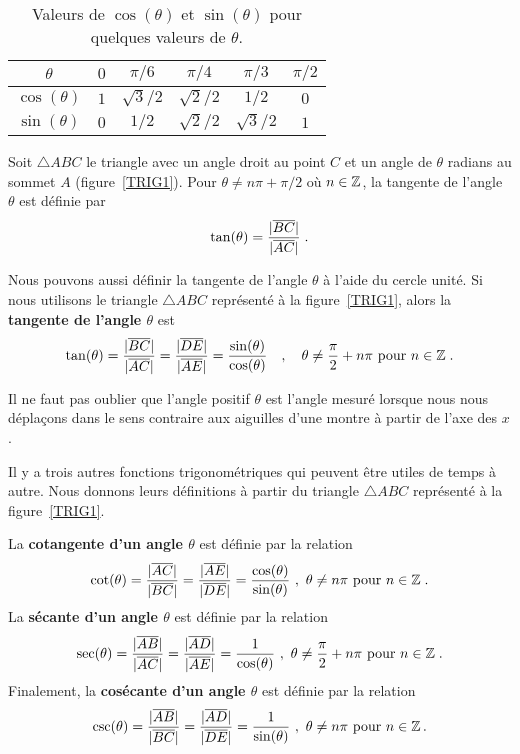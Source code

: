 {\begin{table}
\begin{center}
\begin{tabular}{c|c|c|c|c|c}
$\theta$ & $0$ & $\pi/6$ & $\pi/4$ & $\pi/3$ & $\pi/2$ \\
\hline
$\cos(\theta)$ & $1$ & $\sqrt{3}/2$ &
$\sqrt{2}/2$ & $1/2$ & $0$ \\
\hline
$\sin(\theta)$ & $0$ & $1/2$ &
$\sqrt{2}/2$ & $\sqrt{3}/2$ & $1$
\end{tabular}
\end{center}
\caption{Valeurs de $\cos(\theta)$ et $\sin(\theta)$ pour quelques
valeurs de $\theta$. \label{BAS_VAL}}
\end{table} 

Soit $\triangle ABC$ le triangle avec un angle droit au point $C$ et
un angle de $\theta$ radians au sommet $A$ (figure~\ref{TRIG1}).
Pour $\theta \neq n\pi + \pi/2$ où $n \in \mathbb{Z}$, la tangente de l'angle
$\theta$ est définie par
\[
\tan(\theta) = \frac{|\overline{BC}|}{|\overline{AC}|} \; .
\]

Nous pouvons aussi définir la tangente de l'angle $\theta$ à l'aide du
cercle unité.  Si nous utilisons le triangle $\triangle ABC$
représenté à la figure~\ref{TRIG1}, alors la
{\bfseries tangente de l'angle $\theta$} est  
\[
\tan(\theta) = \frac{|\overline{BC}|}{|\overline{AC}|}
= \frac{|\overline{DE}|}{|\overline{AE}|}
= \frac{\sin(\theta)}{\cos(\theta)}
\quad , \quad \theta \neq \frac{\pi}{2} + n\pi \ \text{pour} \ n\in \mathbb{Z} \; .
\]

Il ne faut pas oublier que l'angle positif $\theta$ est l'angle mesuré
lorsque nous nous déplaçons dans le sens contraire aux aiguilles d'une
montre à partir de l'axe des $x$.

Il y a trois autres fonctions trigonométriques qui peuvent être utiles
de temps à autre.  Nous donnons leurs définitions à partir du triangle
$\triangle ABC$ représenté à la figure~\ref{TRIG1}.

La {\bfseries cotangente d'un angle $\theta$} est
définie par la relation
\[
\cot(\theta) = \frac{|\overline{AC}|}{|\overline{BC}|} 
= \frac{|\overline{AE}|}{|\overline{DE}|} 
= \frac{\cos(\theta)}{\sin(\theta)} \ , \ \theta \neq
n \pi \ \text{pour} \ n\in \mathbb{Z} \; .
\]
La {\bfseries sécante d'un angle $\theta$} est définie
par la relation
\[
\sec(\theta) = \frac{|\overline{AB}|}{|\overline{AC}|} 
= \frac{|\overline{AD}|}{|\overline{AE}|} 
= \frac{1}{\cos(\theta)} \ , \ \theta \neq
\frac{\pi}{2} + n \pi \ \text{pour} \ n\in \mathbb{Z} \; .
\]
Finalement, la {\bfseries cosécante d'un angle $\theta$}
est définie par la relation
\[
\csc(\theta) = \frac{|\overline{AB}|}{|\overline{BC}|} 
= \frac{|\overline{AD}|}{|\overline{DE}|} 
= \frac{1}{\sin(\theta)} \ , \ \theta \neq
n \pi \ \text{pour} \ n\in \mathbb{Z} \, .
\]

}
